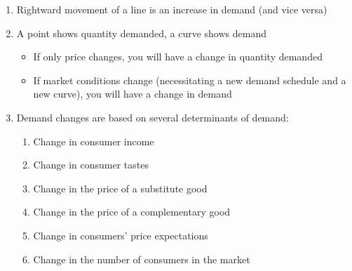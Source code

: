 \documentclass[12pt]{article}
\begin{document}
\begin{enumerate}
  \item Rightward movement of a line is an increase in demand (and vice versa)

  \item A point shows quantity demanded, a curve shows demand

    \begin{itemize}

      \item If only price changes, you will have a change in quantity demanded

      \item If market conditions change (necessitating a new demand schedule and a new curve), you will have a change in demand

    \end{itemize}

    \newpage

  \item Demand changes are based on several determinants of demand:

    \begin{enumerate}

      \item Change in consumer income

      \item Change in consumer tastes

      \item Change in the price of a substitute good

      \item Change in the price of a complementary good

      \item Change in consumers' price expectations

      \item Change in the number of consumers in the market

    \end{enumerate}
    
\end{enumerate}
\end{document}
